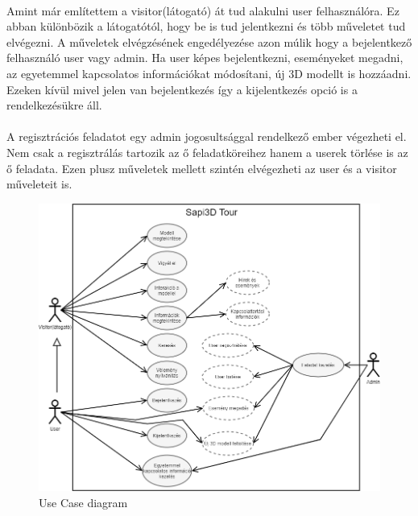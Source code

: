 	\paragraph{}
	Amint már említettem a visitor(látogató) át tud alakulni user felhasználóra. Ez abban különbözik a látogatótól, hogy be is tud jelentkezni és több műveletet tud elvégezni. A műveletek elvégzésének engedélyezése azon múlik hogy a bejelentkező felhasználó user vagy admin. Ha user képes bejelentkezni, eseményeket megadni, az egyetemmel kapcsolatos információkat módosítani, új 3D modellt is hozzáadni. Ezeken kívül mivel jelen van bejelentkezés így a kijelentkezés opció is a rendelkezésükre áll.
	\paragraph{}
	A regisztrációs feladatot egy admin jogosultsággal rendelkező ember végezheti el. Nem csak a regisztrálás tartozik az ő feladatköreihez hanem a userek törlése is az ő feladata. Ezen plusz műveletek mellett szintén elvégezheti az user és a visitor műveleteit is.
	\begin{figure}
		\centering
		\includegraphics[scale=0.6]{figures/images/UseCase.png}
		\caption{Use Case diagram}
		\label{fig:UseCase}
	\end{figure}
\pagebreak